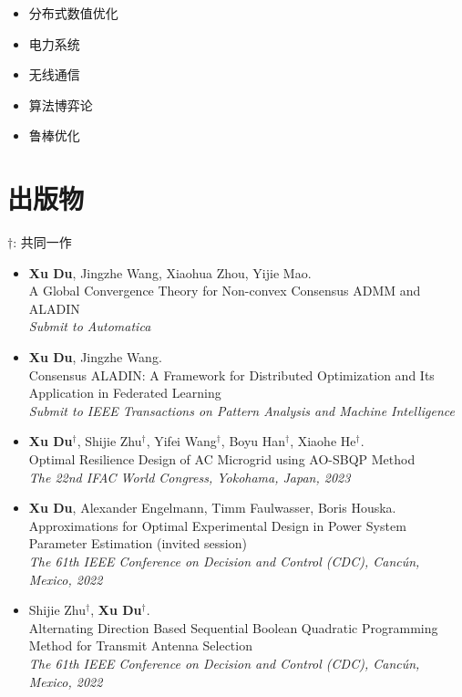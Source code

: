 \documentclass[paper=a4,fontsize=11pt]{scrartcl} %
\newcommand{\NewPart}[1]{\section*{\uppercase{#1}}}
\newcommand{\EducationEntry}[4]{
		\noindent \textbf{#1} \hfill      %
		\colorbox{White}{%
			\parbox{5cm}{%
			\hfill\color{Black}#2}} \par  %
		\noindent \textit{#3} \par        %
		\noindent\hangindent=2em\hangafter=0 \small #4 %
		\normalsize \par}
\begin{document}
\begin{CJK*}{UTF8}{gbsn}
\begin{itemize}
	\item{分布式数值优化}
	
	\item{电力系统}
	\item{无线通信}
	\item{算法博弈论}
		\item{鲁棒优化}
\end{itemize}


\NewPart{出版物}{}
$\dag$:  共同一作
\begin{itemize}
		\item  { \textbf{Xu Du}, Jingzhe Wang, Xiaohua Zhou, Yijie Mao. \\
		{A Global Convergence Theory for Non-convex Consensus ADMM and ALADIN}\\
		\emph{ Submit to Automatica
	} }
	
	\item  { \textbf{Xu Du}, Jingzhe Wang. \\
		{Consensus ALADIN: A Framework for
			Distributed Optimization and Its Application in
			Federated Learning}\\
		\emph{ Submit to IEEE Transactions on Pattern Analysis and Machine Intelligence
	} }
	
		\item  { \textbf{Xu Du}$^{\dag}$, Shijie Zhu$^{\dag}$, Yifei Wang$^{\dag}$, Boyu Han$^{\dag}$, Xiaohe He$^{\dag}$. \\
		{Optimal Resilience Design of AC Microgrid
			using AO-SBQP Method}\\
		\emph{ The 22nd IFAC World Congress, Yokohama, Japan, 2023} }
	
	
		\item  { \textbf{Xu Du}, Alexander Engelmann, Timm Faulwasser, Boris Houska. \\
		{Approximations for Optimal Experimental Design
			in Power System Parameter Estimation (invited session)}\\
		\emph{ The 61th IEEE Conference on Decision and Control (CDC), Canc\'un, Mexico, 2022
		} }
	
	
	\item  { Shijie Zhu$^{\dag}$, \textbf{Xu Du}$^{\dag}$. \\
		{Alternating Direction Based Sequential Boolean Quadratic Programming Method for Transmit Antenna Selection}\\
		\emph{ The 61th IEEE Conference on Decision and Control (CDC), Canc\'un, Mexico, 2022
	} }
	

\end{itemize}
\end{CJK*}
\end{document}
